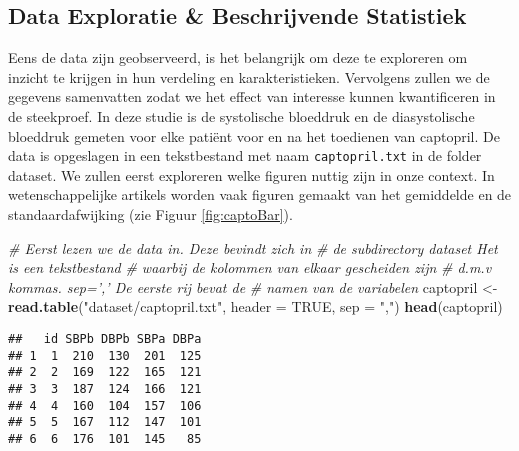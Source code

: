 \documentclass[12pt,dutch,coursenotes]{book}
\newenvironment{Shaded}{\begin{snugshade}}{\end{snugshade}}
\newcommand{\KeywordTok}[1]{\textcolor[rgb]{0.13,0.29,0.53}{\textbf{#1}}}
\newcommand{\DataTypeTok}[1]{\textcolor[rgb]{0.13,0.29,0.53}{#1}}
\newcommand{\StringTok}[1]{\textcolor[rgb]{0.31,0.60,0.02}{#1}}
\newcommand{\CommentTok}[1]{\textcolor[rgb]{0.56,0.35,0.01}{\textit{#1}}}
\newcommand{\OtherTok}[1]{\textcolor[rgb]{0.56,0.35,0.01}{#1}}
\newcommand{\NormalTok}[1]{#1}
\theoremstyle{definition}
\theoremstyle{definition}
\theoremstyle{definition}
\theoremstyle{remark}
\begin{document}
\subsection{Data Exploratie \& Beschrijvende
Statistiek}\label{data-exploratie-beschrijvende-statistiek}

Eens de data zijn geobserveerd, is het belangrijk om deze te exploreren
om inzicht te krijgen in hun verdeling en karakteristieken. Vervolgens
zullen we de gegevens samenvatten zodat we het effect van interesse
kunnen kwantificeren in de steekproef. In deze studie is de systolische
bloeddruk en de diasystolische bloeddruk gemeten voor elke patiënt voor
en na het toedienen van captopril. De data is opgeslagen in een
tekstbestand met naam \texttt{captopril.txt} in de folder dataset. We
zullen eerst exploreren welke figuren nuttig zijn in onze context. In
wetenschappelijke artikels worden vaak figuren gemaakt van het
gemiddelde en de standaardafwijking (zie Figuur \ref{fig:captoBar}).

\begin{Shaded}
\begin{Highlighting}[]
\CommentTok{# Eerst lezen we de data in.  Deze bevindt zich in}
\CommentTok{# de subdirectory dataset Het is een tekstbestand}
\CommentTok{# waarbij de kolommen van elkaar gescheiden zijn}
\CommentTok{# d.m.v kommas. sep=',' De eerste rij bevat de}
\CommentTok{# namen van de variabelen}
\NormalTok{captopril <-}\StringTok{ }\KeywordTok{read.table}\NormalTok{(}\StringTok{"dataset/captopril.txt"}\NormalTok{, }\DataTypeTok{header =} \OtherTok{TRUE}\NormalTok{, }
    \DataTypeTok{sep =} \StringTok{","}\NormalTok{)}
\KeywordTok{head}\NormalTok{(captopril)}
\end{Highlighting}
\end{Shaded}

\begin{verbatim}
##   id SBPb DBPb SBPa DBPa
## 1  1  210  130  201  125
## 2  2  169  122  165  121
## 3  3  187  124  166  121
## 4  4  160  104  157  106
## 5  5  167  112  147  101
## 6  6  176  101  145   85
\end{verbatim}
\end{document}
